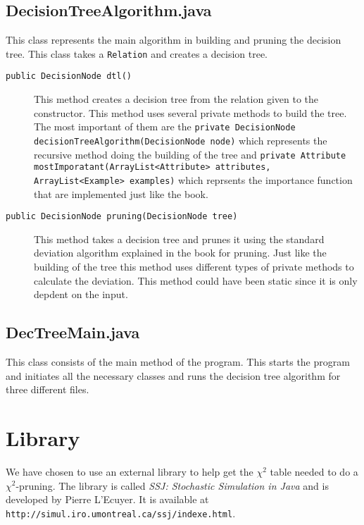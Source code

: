 \documentclass[a4paper]{article}
\begin{document}
\subsection{DecisionTreeAlgorithm.java}
This class represents the main algorithm in building and pruning the decision tree. This class takes a \texttt{Relation} and creates a decision tree.
\begin{description}
\item[\texttt{public DecisionNode dtl()}] This method creates a decision tree from the relation given to the constructor. This method uses several private methods to build the tree. The most important of them are the \texttt{private DecisionNode decisionTreeAlgorithm(DecisionNode node)} which represents the recursive method doing the building of the tree and \texttt{private Attribute mostImporatant(ArrayList<Attribute> attributes, ArrayList<Example> examples)} which reprsents the importance function that are implemented just like the book. 
\item[\texttt{public DecisionNode pruning(DecisionNode tree) }] This method takes a decision tree and prunes it using the standard deviation algorithm explained in the book for pruning. Just like the building of the tree this method uses different types of private methods to calculate the deviation. This method could have been static since it is only depdent on the input. 
\end{description}
\subsection{DecTreeMain.java}
This class consists of the main method of the program. This starts the program and initiates all the necessary classes and runs the decision tree algorithm for three different files.

\section{Library}
We have chosen to use an external library to help get the $\chi^{2}$ table needed to do a $\chi^{2}$-pruning. The library is called \emph{SSJ: Stochastic Simulation in Java} and is developed by Pierre L'Ecuyer. It is available at \texttt{http://simul.iro.umontreal.ca/ssj/indexe.html}.
\end{document}
